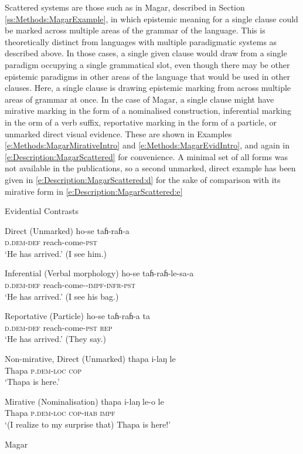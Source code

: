 Scattered systems are those such as in Magar, described in Section \ref{ss:Methods:MagarExample}, in which epistemic meaning for a single clause could be marked across multiple areas of the grammar of the language. This is theoretically distinct from languages with multiple paradigmatic systems as described above. In those cases, a single given clause would draw from a single paradigm occupying a single grammatical slot, even though there may be other epistemic paradigms in other areas of the language that would be used in other clauses. Here, a single clause is drawing epistemic marking from across multiple areas of grammar at once. In the case of Magar, a single clause might have mirative marking in the form of a nominalised construction, inferential marking in the orm of a verb suffix, reportative marking in the form of a particle, or unmarked direct visual evidence. These are shown in Examples \ref{e:Methods:MagarMirativeIntro} and \ref{e:Methods:MagarEvidIntro}, and again in \ref{e:Description:MagarScattered} for convenience. A minimal set of all forms was not available in the publications, so a second unmarked, direct example has been given in \ref{e:Description:MagarScattered:d} for the sake of comparison with its mirative form in \ref{e:Description:MagarScattered:e}

\begin{exe}
        \ex Evidential Contrasts\label{e:Description:MagarScattered}
        \begin{xlist}
          \ex Direct (Unmarked)
          \gll ho-se taɦ-raɦ-a \\
          \textsc{d.dem-def} reach-come-\textsc{pst} \\
          \glt `He has arrived.' (I see him.)
      
          \ex Inferential (Verbal morphology)
          \gll ho-se taɦ-raɦ-le-sa-a \\
          \textsc{d.dem-def} reach-come-\textsc{-impf-infr-pst} \\
          \glt `He has arrived.' (I see his bag.)
      
          \ex Reportative (Particle)
          \gll ho-se taɦ-raɦ-a ta \\
          \textsc{d.dem-def} reach-come-\textsc{pst} \textsc{rep} \\
          \glt `He has arrived.' (They say.)

          \ex Non-mirative, Direct (Unmarked) \label{e:Description:MagarScattered:d}
          \gll thapa i-laŋ le \\
          Thapa \textsc{p.dem-loc} \textsc{cop} \\
          \glt `Thapa is here.'
      
          \ex Mirative (Nominalisation)\label{e:Description:MagarScattered:e}
          \gll thapa i-laŋ le-o le \\
          Thapa \textsc{p.dem-loc} \textsc{cop-hab} \textsc{impf} \\
          \glt `(I realize to my surprise that) Thapa is here!' 
        \end{xlist}
        Magar \cite[Magaric: Nepal,][480, 497]{GrunowHarsta2008}
      \end{exe}

